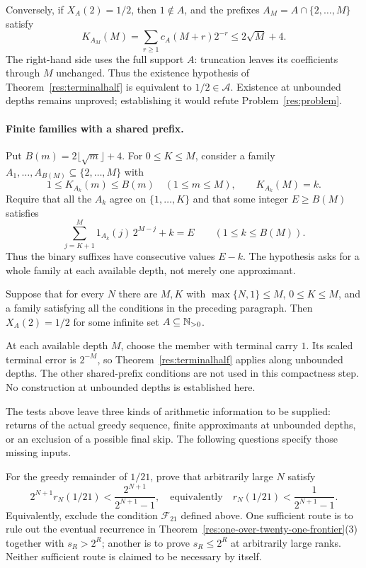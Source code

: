 \documentclass[11pt]{article}
\newcommand{\Ach}{\mathcal A}
\begin{document}
Conversely, if $X_A(2)=1/2$, then $1\notin A$, and the prefixes
$A_M=A\cap\{2,\ldots,M\}$ satisfy
\[
 K_{A_M}(M)=\sum_{r\ge1}c_A(M+r)2^{-r}
       \le 2\sqrt M+4.
\]
The right-hand side uses the full support $A$: truncation leaves its
coefficients through $M$ unchanged. Thus the existence hypothesis of
Theorem~\ref{res:terminalhalf} is equivalent to $1/2\in\Ach$.
Existence at unbounded depths remains unproved; establishing it would
refute Problem~\ref{res:problem}.

\paragraph{Finite families with a shared prefix.}
Put $B(m)=2\lfloor\sqrt m\rfloor+4$.  For $0\le K\le M$, consider a
family $A_1,\ldots,A_{B(M)}\subseteq\{2,\ldots,M\}$ with
\[
 1\le K_{A_k}(m)\le B(m)\quad(1\le m\le M),
 \qquad K_{A_k}(M)=k.
\]
Require that all the $A_k$ agree on $\{1,\ldots,K\}$ and that some
integer $E\ge B(M)$ satisfies
\[
 \sum_{j=K+1}^{M}1_{A_k}(j)\,2^{M-j}+k=E
 \qquad(1\le k\le B(M)).
\]
Thus the binary suffixes have consecutive values $E-k$. The hypothesis
asks for a whole family at each available depth, not merely one
approximant.

\begin{theorem}
\label{res:cylinderhalf}
Suppose that for every $N$ there are $M,K$ with
$\max\{N,1\}\le M$, $0\le K\le M$, and a family satisfying all the
conditions in the preceding paragraph.  Then $X_A(2)=1/2$ for some
infinite set $A\subseteq\mathbb{N}_{>0}$.
\end{theorem}

At each available depth $M$, choose the member with terminal carry
$1$. Its scaled terminal error is $2^{-M}$, so
Theorem~\ref{res:terminalhalf} applies along unbounded depths. The other
shared-prefix conditions are not used in this compactness step.
No construction at unbounded depths is established here.

The tests above leave three kinds of arithmetic information to be
supplied: returns of the actual greedy sequence, finite approximants at
unbounded depths, or an exclusion of a possible final skip. The following
questions specify those missing inputs.

\begin{problem}
\label{prob:one-over-twenty-one-membership}
For the greedy remainder of $1/21$, prove that arbitrarily large $N$
satisfy
\[
 2^{N+1}r_N(1/21)<\frac{2^{N+1}}{2^{N+1}-1},
 \quad\text{equivalently}\quad
 r_N(1/21)<\frac1{2^{N+1}-1}.
\]
Equivalently, exclude the condition $\mathcal F_{21}$ defined above.
One sufficient route is to rule out the eventual recurrence in
Theorem~\ref{res:one-over-twenty-one-frontier}(3) together with $s_R>2^R$;
another is to prove $s_R\le2^R$ at arbitrarily large ranks.  Neither
sufficient route is claimed to be necessary by itself.
\end{problem}
\end{document}

